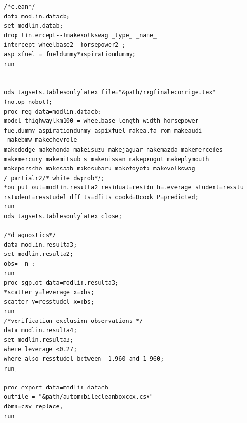 \documentclass[11pt,a4paper]{article}
\begin{document}
\begin{lstlisting}
/*clean*/
data modlin.datacb;
set modlin.datab;
drop tintercept--tmakevolkswag _type_ _name_ 
intercept wheelbase2--horsepower2 ;
aspixfuel = fueldummy*aspirationdummy;
run;


ods tagsets.tablesonlylatex file="&path/regfinalecorrige.tex" 
(notop nobot);
proc reg data=modlin.datacb;
model thighwaylkm100 = wheelbase length width horsepower
fueldummy aspirationdummy aspixfuel makealfa_rom makeaudi
 makebmw makechevrole
makedodge makehonda makeisuzu makejaguar makemazda makemercedes
makemercury makemitsubis makenissan makepeugot makeplymouth
makeporsche makesaab makesubaru maketoyota makevolkswag
/ partialr2/* white dwprob*/;
*output out=modlin.resulta2 residual=residu h=leverage student=resstu
rstudent=resstudel dffits=dfits cookd=Dcook P=predicted;	    		 
run;
ods tagsets.tablesonlylatex close;

/*diagnostics*/
data modlin.resulta3;
set modlin.resulta2;
obs= _n_;
run;
proc sgplot data=modlin.resulta3;
*scatter y=leverage x=obs;
scatter y=resstudel x=obs;
run;
/*verification exclusion observations */
data modlin.resulta4;
set modlin.resulta3;
where leverage <0.27;
where also resstudel between -1.960 and 1.960;
run;

proc export data=modlin.datacb
outfile = "&path/automobilecleanboxcox.csv"
dbms=csv replace;
run;

\end{lstlisting}
\end{document}

